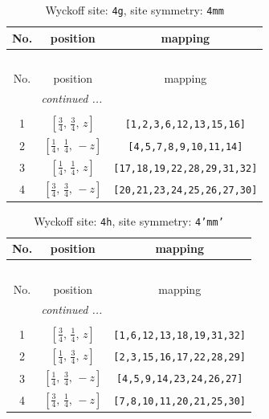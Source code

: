 \documentclass[fleqn,8pt]{jsarticle}
\begin{document}
\renewcommand{\arraystretch}{1.2}
\begin{longtable}{ccc}
\caption{Wyckoff site: {\tt 4g}, site symmetry: {\tt 4mm}}
 \\
 \hline \hline
No. & position & mapping \\ \hline \endfirsthead

\multicolumn{2}{l}{\tablename\ \thetable{}} \\
 \hline \hline
No. & position & mapping \\ \hline \endhead

 \hline \hline
\multicolumn{2}{r}{\footnotesize\it continued ...} \\ \endfoot

 \hline \hline
\multicolumn{2}{r}{} \\ \endlastfoot

1 & $\left[ \frac{3}{4},\, \frac{3}{4},\, z \right]$ & {\tt [1,2,3,6,12,13,15,16]} \\ \hline
2 & $\left[ \frac{1}{4},\, \frac{1}{4},\, - z \right]$ & {\tt [4,5,7,8,9,10,11,14]} \\ \hline
3 & $\left[ \frac{1}{4},\, \frac{1}{4},\, z \right]$ & {\tt [17,18,19,22,28,29,31,32]} \\ \hline
4 & $\left[ \frac{3}{4},\, \frac{3}{4},\, - z \right]$ & {\tt [20,21,23,24,25,26,27,30]} \\
\end{longtable}
\renewcommand{\arraystretch}{1.2}
\begin{longtable}{ccc}
\caption{Wyckoff site: {\tt 4h}, site symmetry: {\tt 4'mm'}}
 \\
 \hline \hline
No. & position & mapping \\ \hline \endfirsthead

\multicolumn{2}{l}{\tablename\ \thetable{}} \\
 \hline \hline
No. & position & mapping \\ \hline \endhead

 \hline \hline
\multicolumn{2}{r}{\footnotesize\it continued ...} \\ \endfoot

 \hline \hline
\multicolumn{2}{r}{} \\ \endlastfoot

1 & $\left[ \frac{3}{4},\, \frac{1}{4},\, z \right]$ & {\tt [1,6,12,13,18,19,31,32]} \\ \hline
2 & $\left[ \frac{1}{4},\, \frac{3}{4},\, z \right]$ & {\tt [2,3,15,16,17,22,28,29]} \\ \hline
3 & $\left[ \frac{1}{4},\, \frac{3}{4},\, - z \right]$ & {\tt [4,5,9,14,23,24,26,27]} \\ \hline
4 & $\left[ \frac{3}{4},\, \frac{1}{4},\, - z \right]$ & {\tt [7,8,10,11,20,21,25,30]} \\
\end{longtable}
\end{document}
